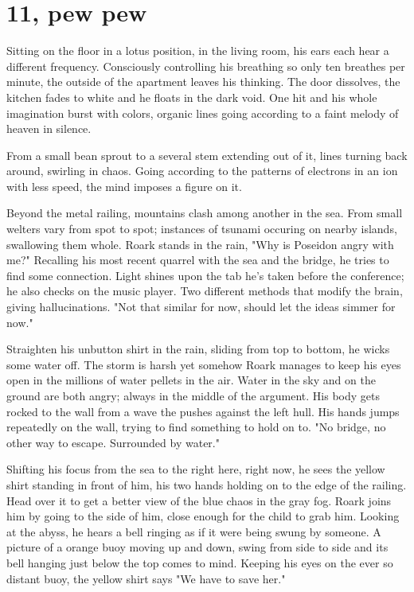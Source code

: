 \section{11, pew pew}

        Sitting on the floor in a lotus position, in the living room, his ears each hear a different frequency. Consciously controlling his
    breathing so only ten breathes per minute, the outside of the apartment leaves his thinking. The door dissolves, the kitchen fades to white
    and he floats in the dark void. One hit and his whole imagination burst with colors, organic lines going according to a faint melody of
    heaven in silence. 

        From a small bean sprout to a several stem extending out of it, lines turning back around, swirling in chaos. Going according to
    the patterns of electrons in an ion with less speed, the mind imposes a figure on it.

        Beyond the metal railing, mountains clash among another in the sea. From small welters vary from spot to spot; instances of tsunami
    occuring on nearby islands, swallowing them whole. Roark stands in the rain, "Why is Poseidon angry with me?" Recalling his most recent
    quarrel with the sea and the bridge, he tries to find some connection. Light shines upon the tab he's taken before the conference; he also
    checks on the music player. Two different methods that modify the brain, giving hallucinations. "Not that similar for now, should let the
    ideas simmer for now."

        Straighten his unbutton shirt in the rain, sliding from top to bottom, he wicks some water off. The storm is harsh yet somehow Roark
    manages to keep his eyes open in the millions of water pellets in the air. Water in the sky and on the ground are both angry; always in
    the middle of the argument. His body gets rocked to the wall from a wave the pushes against the left hull. His hands jumps repeatedly on the
    wall, trying to find something to hold on to. "No bridge, no other way to escape. Surrounded by water."

        Shifting his focus from the sea to the right here, right now, he sees the yellow shirt standing in front of him, his two hands holding
    on to the edge of the railing. Head over it to get a better view of the blue chaos in the gray fog. Roark joins him by going to the side of
    him, close enough for the child to grab him. Looking at the abyss, he hears a bell ringing as if it were being swung by someone. A
    picture of a orange buoy moving up and down, swing from side to side and its bell hanging just below the top comes to mind. Keeping his eyes
    on the ever so distant buoy, the yellow shirt says "We have to save her."

